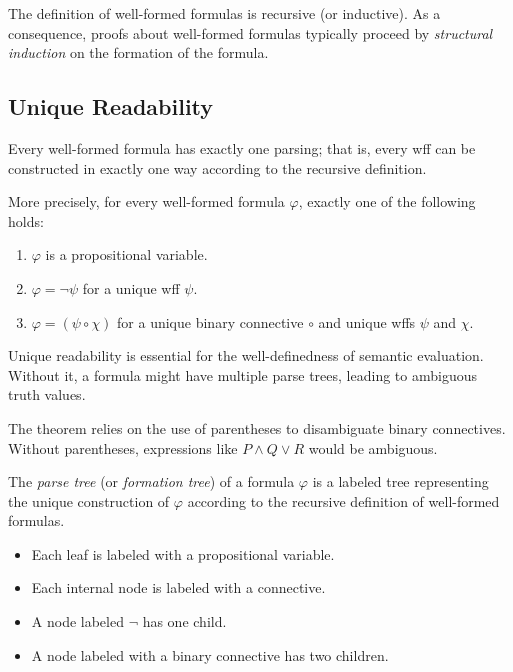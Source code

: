 \begin{remark}
The definition of well-formed formulas is recursive (or inductive). As a
consequence, proofs about well-formed formulas typically proceed by
\emph{structural induction} on the formation of the formula.
\end{remark}

\subsection{Unique Readability}

\begin{theorem}
Every well-formed formula has exactly one parsing; that is, every wff can be
constructed in exactly one way according to the recursive definition.

More precisely, for every well-formed formula $\varphi$, exactly one of the
following holds:
\begin{enumerate}
  \item $\varphi$ is a propositional variable.
  \item $\varphi = \neg\psi$ for a unique wff $\psi$.
  \item $\varphi = (\psi \circ \chi)$ for a unique binary connective $\circ$ and
        unique wffs $\psi$ and $\chi$.
\end{enumerate}
\end{theorem}

\begin{remark}
Unique readability is essential for the well-definedness of semantic evaluation.
Without it, a formula might have multiple parse trees, leading to ambiguous
truth values.

The theorem relies on the use of parentheses to disambiguate binary connectives.
Without parentheses, expressions like $P \wedge Q \vee R$ would be ambiguous.
\end{remark}

\begin{definition}
The \emph{parse tree} (or \emph{formation tree}) of a formula $\varphi$ is a
labeled tree representing the unique construction of $\varphi$ according to the
recursive definition of well-formed formulas.

\begin{itemize}
  \item Each leaf is labeled with a propositional variable.
  \item Each internal node is labeled with a connective.
  \item A node labeled $\neg$ has one child.
  \item A node labeled with a binary connective has two children.
\end{itemize}
\end{definition}

